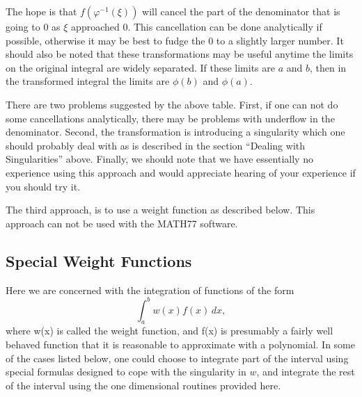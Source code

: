 \documentclass[twoside]{MATH77}
\begin{document}
The hope is that $f(\varphi^{-1}(\xi))$ will cancel the part of the
denominator that is going to 0 as $\xi$ approached 0.  This
cancellation can be done analytically if possible, otherwise it may be
best to fudge the 0 to a slightly larger number.  It should also be
noted that these transformations may be useful anytime the limits on
the original integral are widely separated.  If these limits are $a$
and $b$, then in the transformed integral the limits are $\phi(b)$ and
$\phi(a)$.

There are two problems suggested by the above table.  First, if one
can not do some cancellations analytically, there may be problems with
underflow in the denominator.  Second, the transformation is
introducing a singularity which one should probably deal with as is
described in the section ``Dealing with Singularities'' above.
Finally, we should note that we have essentially no experience using
this approach and would appreciate hearing of your experience if you
should try it.

The third approach, is to use a weight function as described below.  This
approach can not be used with the MATH77 software.

\subsection{Special Weight Functions}\label{weight}

Here we are concerned with the integration of functions of the form
\begin{equation*}
\int_a^b w(x) f(x)\,dx,
\end{equation*}
where w(x) is called the weight function, and f(x) is presumably a
fairly well behaved function that it is reasonable to approximate
with a polynomial.  In some of the cases listed below, one could
choose to integrate part of the interval using special formulas
designed to cope with the singularity in $w$, and integrate the rest
of the interval using the one dimensional routines provided here.
\end{document}
